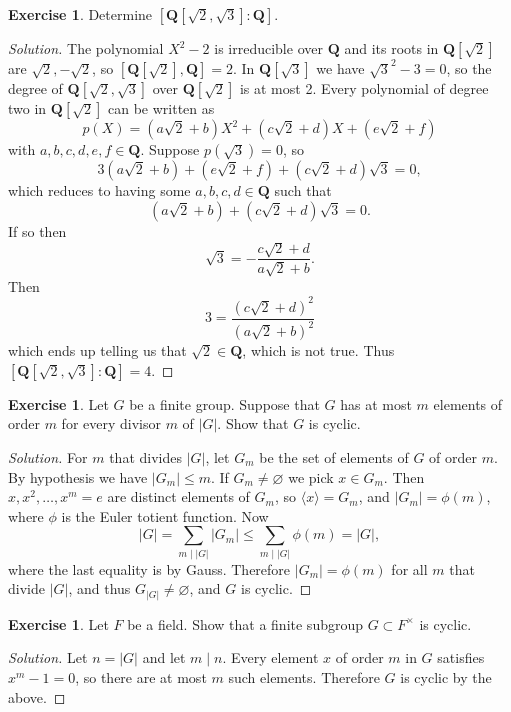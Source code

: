 \documentclass[11pt]{amsart}
\theoremstyle{definition}
\newtheorem{e}[theo]{Exercise}
\newenvironment{s}{\begin{proof}[Solution]}{\end{proof}}
\def\empty{\varnothing}
\def\<{\langle}
\def\>{\rangle}
\def\QQ{\mathbf{Q}}
\begin{document}
\begin{e}
Determine $[\QQ[\sqrt 2, \sqrt 3] : \QQ]$.
\end{e}

\begin{s}
The polynomial $X^2 - 2$ is irreducible over $\QQ$ and its roots in $\QQ[\sqrt 2]$ are $\sqrt 2, -\sqrt 2$, so $[\QQ[\sqrt 2], \QQ] = 2$.
In $\QQ[\sqrt 3]$ we have $\sqrt 3^2 - 3 = 0$, so the degree of $\QQ[\sqrt 2,\sqrt 3]$ over $\QQ[\sqrt 2]$ is at most 2.
Every polynomial of degree two in $\QQ[\sqrt 2]$ can be written as
\[
p(X) = (a \sqrt 2 + b) X^2 + (c \sqrt 2 + d) X + (e \sqrt 2 + f)
\]
with $a,b,c,d,e,f \in \QQ$.
Suppose $p(\sqrt 3) = 0$, so
\[
3 (a \sqrt 2 + b) + (e \sqrt 2 + f) + (c \sqrt 2 + d) \sqrt 3 = 0,
\]
which reduces to having some $a,b,c,d \in \QQ$ such that
\[
(a \sqrt 2 + b) + (c \sqrt 2 + d) \sqrt 3 = 0.
\]
If so then
\[
\sqrt 3 = -\frac{c \sqrt 2 + d}{a \sqrt 2 + b}.
\]
Then
\[
3 = \frac{(c \sqrt 2 + d)^2}{(a \sqrt 2 + b)^2}
\]
which ends up telling us that $\sqrt 2 \in \QQ$, which is not true.
Thus $[\QQ[\sqrt 2, \sqrt 3] : \QQ] = 4$.
\end{s}

\begin{e}
Let $G$ be a finite group.
Suppose that $G$ has at most $m$ elements of order $m$ for every divisor $m$ of $|G|$.
Show that $G$ is cyclic.
\end{e}

\begin{s}
For $m$ that divides $|G|$, let $G_m$ be the set of elements of $G$ of order $m$.
By hypothesis we have $|G_m| \leq m$.
If $G_m \not= \empty$ we pick $x \in G_m$.
Then $x, x^2, \ldots, x^m = e$ are distinct elements of $G_m$, so $\< x \> = G_m$, and $|G_m| = \phi(m)$, where $\phi$ is the Euler totient function.
Now
\[
|G|
= \sum_{m \mid |G|} |G_m|
\leq \sum_{m \mid |G|} \phi(m)
= |G|,
\]
where the last equality is by Gauss.
Therefore $|G_m| = \phi(m)$ for all $m$ that divide $|G|$, and thus $G_{|G|} \not= \empty$, and $G$ is cyclic.
\end{s}


\begin{e}
Let $F$ be a field.
Show that a finite subgroup $G \subset F^\times$ is cyclic.
\end{e}

\begin{s}
Let $n = |G|$ and let $m \mid n$.
Every element $x$ of order $m$ in $G$ satisfies $x^m - 1 = 0$, so there are at most $m$ such elements.
Therefore $G$ is cyclic by the above.
\end{s}
\end{document}
